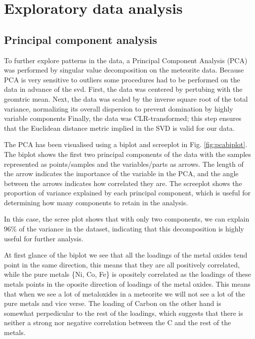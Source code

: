 \section{Exploratory data analysis}

\subsection{Principal component analysis }

To further explore patterns in the data, a Principal Component Analysis (PCA) was performed by singular value decomposition on the meteorite data.
Because PCA is very sensitive to outliers some procedures had to be performed on the data in advance of the svd. First,
the data was centered by pertubing with the geomtric mean. Next, the data was scaled by the inverse square 
root of the total variance, normalizing its overall dispersion to prevent domination by highly variable components Finally, 
the data was CLR-transformed; this step ensures that the Euclidean distance metric implied in the SVD is valid for our data.  

The PCA has been visualised using a biplot and screeplot in Fig. \ref{fig:pcabiplot}. The biplot shows the first two principal components of the data with the samples
represented as points/samples and the variables/parts as arrows. The length of the arrow indicates the importance of the variable in the PCA, and the angle between the arrows indicates how correlated they are.
The screeplot shows the proportion of variance explained by each principal component, which is useful for determining how many components to retain in the analysis. 

In this case, the scree plot shows that with only two components, we can explain 96\% of the variance in the dataset, indicating that this decomposition is highly useful for further analysis.

At first glance of the biplot we see that all the loadings of the metal oxides tend point in the same direction, this means that they are all positively correlated, while the pure metals \{Ni, Co, Fe\} is opositely correlated as the loadings of these metals points in the oposite direction of loadings of the metal oxides. This means that when we see a lot of metaloxides in a meteorite we will not see a lot of the pure metals and vice verse. The loading of Carbon on the other hand is somewhat 
perpedicular to the rest of the loadings, which suggests that there is neither a strong nor negative correlation between the 
C and the rest of the metals. 

